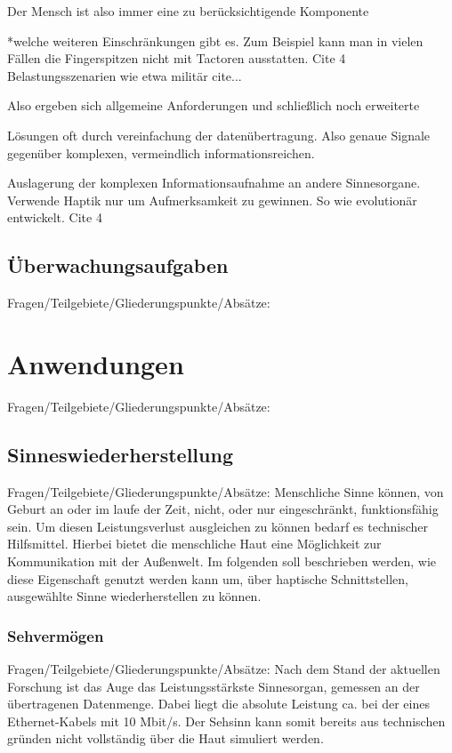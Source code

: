 \documentclass{llncs}					%
\begin{document}
Der Mensch ist also immer eine zu berücksichtigende Komponente

*welche weiteren Einschränkungen gibt es.
Zum Beispiel kann man in vielen Fällen die Fingerspitzen nicht mit Tactoren ausstatten. Cite 4
Belastungsszenarien wie etwa militär cite...

Also ergeben sich allgemeine Anforderungen und schließlich noch erweiterte

Lösungen oft durch vereinfachung der datenübertragung. Also genaue Signale gegenüber komplexen, vermeindlich informationsreichen.

Auslagerung der komplexen Informationsaufnahme an andere Sinnesorgane. Verwende Haptik nur um Aufmerksamkeit zu gewinnen. So wie evolutionär entwickelt. Cite 4

\subsection{Überwachungsaufgaben}
Fragen/Teilgebiete/Gliederungspunkte/Absätze:

\section{Anwendungen}
Fragen/Teilgebiete/Gliederungspunkte/Absätze:

\subsection{Sinneswiederherstellung}
Fragen/Teilgebiete/Gliederungspunkte/Absätze:
Menschliche Sinne können, von Geburt an oder im laufe der Zeit, nicht, oder nur eingeschränkt, funktionsfähig sein. Um diesen Leistungsverlust ausgleichen zu können bedarf es technischer Hilfsmittel. Hierbei bietet die menschliche Haut eine Möglichkeit zur Kommunikation mit der Außenwelt. Im folgenden soll beschrieben werden, wie diese Eigenschaft genutzt werden kann um, über haptische Schnittstellen, ausgewählte Sinne wiederherstellen zu können.

\subsubsection{Sehvermögen}
Fragen/Teilgebiete/Gliederungspunkte/Absätze:
Nach dem Stand der aktuellen Forschung ist das Auge das Leistungsstärkste Sinnesorgan, gemessen an der übertragenen Datenmenge\cite{Koch2006}. Dabei liegt die absolute Leistung ca. bei der eines Ethernet-Kabels mit 10 Mbit/s\cite{Koch2006}. Der Sehsinn kann somit bereits aus technischen gründen nicht vollständig über die Haut simuliert werden.
\end{document}

